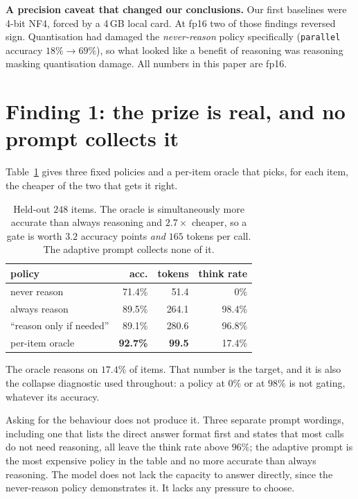 \documentclass[10pt,twocolumn]{article}
\begin{document}
\textbf{A precision caveat that changed our conclusions.} Our first baselines
were 4-bit NF4, forced by a 4\,GB local card. At fp16 two of those findings
reversed sign. Quantisation had damaged the \emph{never-reason} policy
specifically (\texttt{parallel} accuracy $18\%\rightarrow69\%$), so what looked
like a benefit of reasoning was reasoning masking quantisation damage. All
numbers in this paper are fp16.

\section{Finding 1: the prize is real, and no prompt collects it}
\label{sec:prize}

Table~\ref{tab:anchors} gives three fixed policies and a per-item oracle that
picks, for each item, the cheaper of the two that gets it right.

\begin{table}[t]
\centering\small
\begin{tabular}{lrrr}
\toprule
policy & acc. & tokens & think rate\\
\midrule
never reason        & 71.4\% & 51.4 & 0\%\\
always reason       & 89.5\% & 264.1 & 98.4\%\\
``reason only if needed'' & 89.1\% & 280.6 & 96.8\%\\
\midrule
per-item oracle     & \textbf{92.7\%} & \textbf{99.5} & 17.4\%\\
\bottomrule
\end{tabular}
\caption{Held-out $248$ items. The oracle is simultaneously more accurate than
always reasoning and $2.7\times$ cheaper, so a gate is worth $3.2$ accuracy
points \emph{and} $165$ tokens per call. The adaptive prompt collects none of it.}
\label{tab:anchors}
\end{table}

The oracle reasons on $17.4\%$ of items. That number is the target, and it is
also the collapse diagnostic used throughout: a policy at $0\%$ or at $98\%$ is
not gating, whatever its accuracy.

Asking for the behaviour does not produce it. Three separate prompt wordings,
including one that lists the direct answer format first and states that most
calls do not need reasoning, all leave the think rate above $96\%$; the adaptive
prompt is the most expensive policy in the table and no more accurate than
always reasoning. The model does not lack the capacity to answer directly, since
the never-reason policy demonstrates it. It lacks any pressure to choose.
\end{document}
